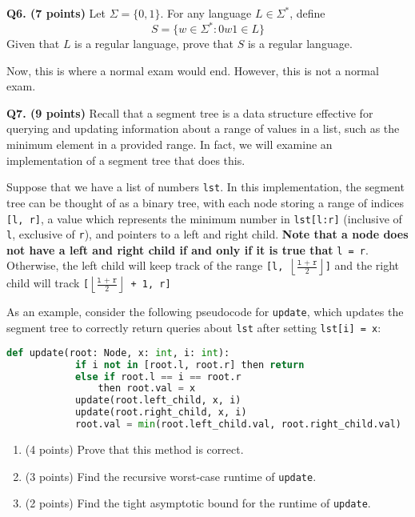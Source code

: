 \documentclass{article}
\begin{document}
    \pagebreak

    \noindent\textbf{Q6. (7 points)} Let \(\Sigma = \{0, 1\}\). For any language \(L \in \Sigma ^*\), define
    \[
        S = \{w \in \Sigma ^* : 0w1 \in L\}
    \]
    Given that \(L\) is a regular language, prove that \(S\) is a regular language.

    \pagebreak

    Now, this is where a normal exam would end. However, this is not a normal exam.

    \bigskip

    \noindent\textbf{Q7. (9 points)} Recall that a segment tree is a data structure effective for querying and updating information about a range of values in a list, such as the minimum element in a provided range. In fact, we will examine an implementation of a segment tree that does this.

    \medskip

    Suppose that we have a list of numbers \texttt{lst}. In this implementation, the segment tree can be thought of as a binary tree, with each node storing a range of indices \texttt{[l, r]}, a value which represents the minimum number in \texttt{lst[l:r]} (inclusive of \texttt{l}, exclusive of \texttt{r}), and pointers to a left and right child. \textbf{Note that a node does not have a left and right child if and only if it is true that} \texttt{l = r}. Otherwise, the left child will keep track of the range \texttt{[l, \(\left\lfloor \frac{\texttt{l + r}}{2} \right\rfloor\)]} and the right child will track \texttt{[\(\left\lfloor \frac{\texttt{l + r}}{2} \right\rfloor\) + 1, r]}

    \medskip

    As an example, consider the following pseudocode for \texttt{update}, which updates the segment tree to correctly return queries about \texttt{lst} after setting \texttt{lst[i] = x}:

    \begin{lstlisting}[language=Python]
        def update(root: Node, x: int, i: int):
            if i not in [root.l, root.r] then return
            else if root.l == i == root.r
                then root.val = x
            update(root.left_child, x, i)
            update(root.right_child, x, i)
            root.val = min(root.left_child.val, root.right_child.val)
    \end{lstlisting}
    \begin{enumerate}[label=\alph*)]
        \item (4 points) Prove that this method is correct.
        \pagebreak
        \item (3 points) Find the recursive worst-case runtime of \texttt{update}.
        \vfill
        \item (2 points) Find the tight asymptotic bound for the runtime of \texttt{update}.
        \vfill
    \end{enumerate}
\end{document}

